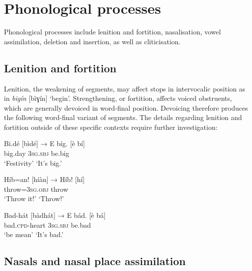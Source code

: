 \section{Phonological processes}\label{sec:2.5}

Phonological processes include lenition and fortition, nasalisation, vowel assimilation, deletion and insertion, as well as cliticisation.

\subsection{Lenition and fortition}\label{sec:2.5.1}

Lenition, the weakening of segments, may affect stops in intervocalic position as in \textit{bigín} [bìɣín] ‘begin’. Strengthening, or fortition, affects voiced obstruents, which are generally devoiced in word-final position. Devoicing therefore produces the following word-final variant of segments. The details regarding lenition and fortition outside of these specific contexts require further investigation:


\ea%
    \label{ex:key:24}
    \gll   Bi.dé      [bìdé]      →    E    bíg.      [è  bí]\\
big.day                  \textsc{3sg.sbj}  be.big\\

\glt ‘Festivity’                ‘It’s big.’
\z


\ea%
    \label{ex:key:25}
    \gll   Híb=an!      [híàn]      →    Híb!          [hí]\\
throw=\textsc{3sg.obj}                throw\\


\glt ‘Throw it!’                ‘Throw!’\\
\z

\ea%
    \label{ex:key:26}
    \gll   Bad-hát      [bàdhát]      →    E    bád.      [è  bá]\\
bad.\textsc{cpd}{}-heart                \textsc{3sg.sbj}  be.bad\\

\glt ‘be mean’                ‘It’s bad.’
\z

\subsection{Nasals and nasal place assimilation}\label{sec:2.5.2}

